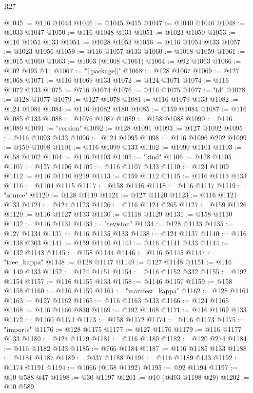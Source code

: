 \begin{lexlean}{R27}
\begin{coremodule}
@1045 := @116 @1044
@1046 := @1045 @415
@1047 := @1040 @1046
@1048 := @1033 @1047
@1050 := @116 @1048 @133
@1051 := @1023 @1050
@1053 := @116 @1051 @133
@1054 := @1028 @1053
@1056 := @116 @1054 @133
@1057 := @1023 @1056
@1059 := @116 @1057 @133
@1060 := @1018 @1059
@1061 := @1015 @1060
@1063 := @1003 (@1008 @1061)
@1064 := @92 @1063
@1066 := @102 @495 @11
@1067 := "[[package]]"
@1068 := @128 @1067
@1069 := @127 @1068
@1071 := @116 @1069 @133
@1072 := @124 @1071
@1074 := @116 @1072 @133
@1075 := @716 @1074
@1076 := @116 @1075
@1077 := "id"
@1078 := @128 @1077
@1079 := @127 @1078
@1081 := @116 @1079 @133
@1082 := @124 @1081
@1084 := @116 @1082 @180
@1085 := @159 @1084
@1087 := @116 @1085 @133
@1088 := @1076 @1087
@1089 := @158 @1088
@1090 := @116 @1089
@1091 := "version"
@1092 := @128 @1091
@1093 := @127 @1092
@1095 := @116 @1093 @133
@1096 := @124 @1095
@1098 := @116 @1096 @202
@1099 := @159 @1098
@1101 := @116 @1099 @133
@1102 := @1090 @1101
@1103 := @158 @1102
@1104 := @116 @1103
@1105 := "kind"
@1106 := @128 @1105
@1107 := @127 @1106
@1109 := @116 @1107 @133
@1110 := @124 @1109
@1112 := @116 @1110 @219
@1113 := @159 @1112
@1115 := @116 @1113 @133
@1116 := @1104 @1115
@1117 := @158 @1116
@1118 := @116 @1117
@1119 := "source"
@1120 := @128 @1119
@1121 := @127 @1120
@1123 := @116 @1121 @133
@1124 := @124 @1123
@1126 := @116 @1124 @265
@1127 := @159 @1126
@1129 := @116 @1127 @133
@1130 := @1118 @1129
@1131 := @158 @1130
@1132 := @116 @1131
@1133 := "revision"
@1134 := @128 @1133
@1135 := @127 @1134
@1137 := @116 @1135 @133
@1138 := @124 @1137
@1140 := @116 @1138 @303
@1141 := @159 @1140
@1143 := @116 @1141 @133
@1144 := @1132 @1143
@1145 := @158 @1144
@1146 := @116 @1145
@1147 := "tree_kappa"
@1148 := @128 @1147
@1149 := @127 @1148
@1151 := @116 @1149 @133
@1152 := @124 @1151
@1154 := @116 @1152 @332
@1155 := @192 @1154
@1157 := @116 @1155 @133
@1158 := @1146 @1157
@1159 := @158 @1158
@1160 := @116 @1159
@1161 := "manifest_kappa"
@1162 := @128 @1161
@1163 := @127 @1162
@1165 := @116 @1163 @133
@1166 := @124 @1165
@1168 := @116 @1166 @830
@1169 := @192 @1168
@1171 := @116 @1169 @133
@1172 := @1160 @1171
@1173 := @158 @1172
@1174 := @116 @1173
@1175 := "imports"
@1176 := @128 @1175
@1177 := @127 @1176
@1179 := @116 @1177 @133
@1180 := @124 @1179
@1181 := @116 @1180
@1182 := @120 @274
@1184 := @116 @1182 @133
@1185 := @766 @1184
@1187 := @116 @1185 @133
@1188 := @1181 @1187
@1189 := @437 @1188
@1191 := @116 @1189 @133
@1192 := @1174 @1191
@1194 := @1066 (@158 @1192)
@1195 := @92 @1194
@1197 := @10 @588 @47
@1198 := @30 @1197
@1201 := @10 (@493 @1198 @29)
@1202 := @10 @589

\end{coremodule}
\end{lexlean}
